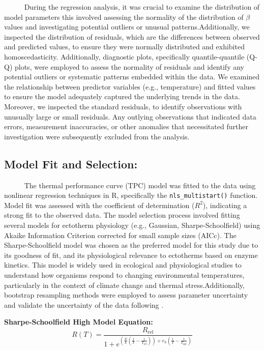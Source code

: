 \documentclass[
]{article}
\begin{document}
~~~~~ During the regression analysis, it was crucial to examine the
distribution of model parameters this involved assessing the normality
of the distribution of \(\beta\) values and investigating potential
outliers or unusual patterns.Additionally, we inspected the distribution
of residuals, which are the differences between observed and predicted
values, to ensure they were normally distributed and exhibited
homoscedasticity. Additionally, diagnostic plots, specifically
quantile-quantile (Q-Q) plots, were employed to assess the normality of
residuals and identify any potential outliers or systematic patterns
embedded within the data. We examined the relationship between predictor
variables (e.g., temperature) and fitted values to ensure the model
adequately captured the underlying trends in the data. Moreover, we
inspected the standard residuals, to identify observations with
unusually large or small residuals. Any outlying observations that
indicated data errors, measurement inaccuracies, or other anomalies that
necessitated further investigation were subsequently excluded from the
analysis.

\newpage

\subsection*{Model Fit and Selection:}

~~~~~ The thermal performance curve (TPC) model was fitted to the data
using nonlinear regression techniques in R, specifically the
\texttt{nls\_multistart()} function. Model fit was assessed with the
coefficient of determination (\(R^2\)), indicating a strong fit to the
observed data. The model selection process involved fitting several
models for ectotherm physiology (e.g., Gaussian, Sharpe-Schoolfield)
using Akaike Information Criterion corrected for small sample sizes
(AICc). The Sharpe-Schoolfield model was chosen as the preferred model
for this study due to its goodness of fit, and its physiological
relevance to ectotherms based on enzyme kinetics. This model is widely
used in ecological and physiological studies to understand how organisms
respond to changing environmental temperatures, particularly in the
context of climate change and thermal stress.Additionally, bootstrap
resampling methods were employed to assess parameter uncertainty and
validate the uncertainty of the data following
\cite{Olito2017estimating}.

\textbf{Sharpe-Schoolfield High Model Equation:} \begin{equation}
R(T) = \frac{R_{\text{ref}}}{1 + e^{\left(\frac{E}{k}\left(\frac{1}{T} - \frac{1}{T_{\text{ref}}}\right)\right) + e_h\left(\frac{1}{T} - \frac{1}{T_{\text{opt}}}\right)}}
\end{equation}
\end{document}

